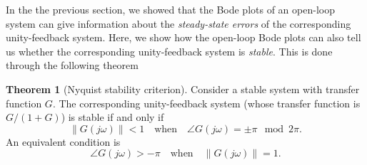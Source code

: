 \documentclass[a4paper,11pt]{report}
\theoremstyle{definition}
\newtheorem{theorem}{Theorem}
\begin{document}
In the the previous section, we showed that the Bode plots of an
open-loop system can give information about the \emph{steady-state
  errors} of the corresponding unity-feedback system. Here, we show
how the open-loop Bode plots can also tell us whether the
corresponding unity-feedback system is \emph{stable}. This is done
through the following theorem

\begin{theorem}[Nyquist stability criterion]
  Consider a stable system with transfer function $G$. The
  corresponding unity-feedback system (whose transfer function is
  $G/(1+G)$) is stable if and only if
  \begin{equation}
    \label{eq:nyq}
    \|G(j\omega)\| < 1\quad \textrm{when}\quad \angle G(j\omega) = \pm\pi
    \mod 2\pi.  
  \end{equation}
  An equivalent condition is
  \begin{equation}
    \label{eq:nyq2}
    \angle G(j\omega) > -\pi \quad \textrm{when}\quad
    \|G(j\omega)\| = 1.  
  \end{equation}
\end{theorem}
\end{document}
